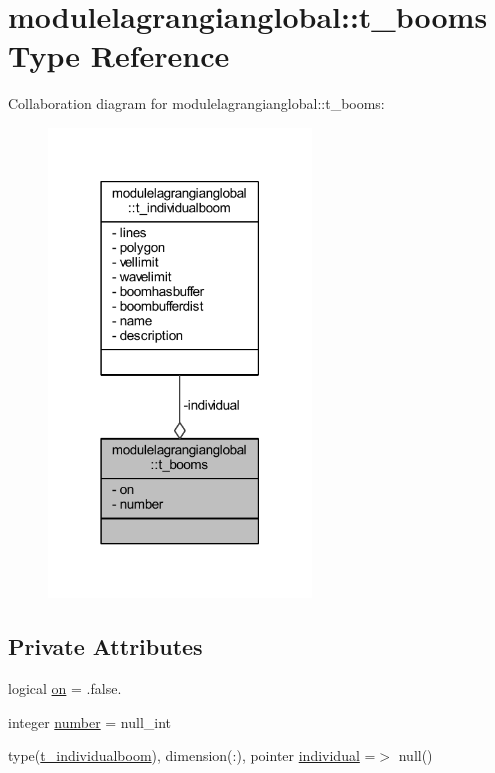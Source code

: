 \hypertarget{structmodulelagrangianglobal_1_1t__booms}{}\section{modulelagrangianglobal\+:\+:t\+\_\+booms Type Reference}
\label{structmodulelagrangianglobal_1_1t__booms}


Collaboration diagram for modulelagrangianglobal\+:\+:t\+\_\+booms\+:\nopagebreak
\begin{figure}[H]
\begin{center}
\leavevmode
\includegraphics[width=198pt]{structmodulelagrangianglobal_1_1t__booms__coll__graph}
\end{center}
\end{figure}
\subsection*{Private Attributes}
\begin{DoxyCompactItemize}
\item 
logical \mbox{\hyperlink{structmodulelagrangianglobal_1_1t__booms_aa1c4861c5d174856cd2bea86ecf52bce}{on}} = .false.
\item 
integer \mbox{\hyperlink{structmodulelagrangianglobal_1_1t__booms_addce761c48c78b31fc79d389e283a6ef}{number}} = null\+\_\+int
\item 
type(\mbox{\hyperlink{structmodulelagrangianglobal_1_1t__individualboom}{t\+\_\+individualboom}}), dimension(\+:), pointer \mbox{\hyperlink{structmodulelagrangianglobal_1_1t__booms_aaf33e1a50497253ee70c9a44f353d01c}{individual}} =$>$ null()
\end{DoxyCompactItemize}


